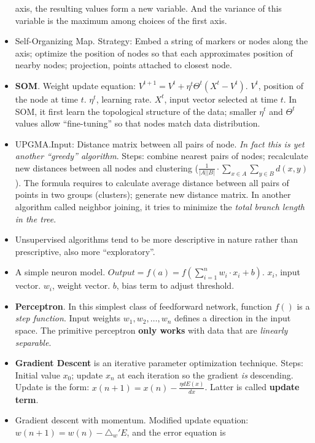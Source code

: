 \documentclass[twocolumn]{article}
\begin{document}
\begin{itemize}
  axis, the resulting values form a new variable. And the variance of
  this variable is the maximum among choices of the first axis.
\item Self-Organizing Map. Strategy: Embed a string of markers or
  nodes along the axis; optimize the position of nodes so that each
  approximates position of nearby nodes; projection, points attached
  to closest node.
\item \textbf{SOM}. Weight update equation:
  $V^{t+1}=V^{t}+\eta^{t}\Theta^{t}(X^{t}-V^{t})$. $V^{t}$, position
  of the node at time $t$. $\eta^{t}$, learning rate. $X^{t}$, input
  vector selected at time $t$. In SOM, it first learn the topological
  structure of the data; smaller $\eta^{t}$ and $\Theta^{t}$ values
  allow ``fine-tuning'' so that nodes match data distribution. 
\item UPGMA.\@ Input: Distance matrix between all pairs of
  node. \emph{In fact this is yet another ``greedy''
    algorithm}. Steps: combine nearest pairs of nodes; recalculate new
  distances between all nodes and clustering ($\frac{1}{|A||B|}\cdot
  \sum_{x\in A}\sum_{y\in B}d(x,y)$). The formula requires to
  calculate average distance between all pairs of points in two groups
  (clusters); generate new distance matrix. In another algorithm
  called neighbor joining, it tries to minimize the \emph{total branch
  length in the tree}.
\item Unsupervised algorithms tend to be more descriptive in nature
  rather than prescriptive, also more ``exploratory''. 
\item A simple neuron model. $Output=f(a)=f(\sum_{i=1}^{n}w_{i}\cdot
  x_{i}+b)$. $x_{i}$, input vector. $w_{i}$, weight vector. $b$, bias
  term to adjust threshold. 
\item \textbf{Perceptron}. In this simplest class of feedforward
  network, function $f()$ is a \emph{step function}. Input weights
  $w_{1},w_{2}, \ldots, w_{n}$ defines a direction in the input
  space. The primitive perceptron \textbf{only works} with data that
  are \emph{linearly separable}.
\item \textbf{Gradient Descent} is an iterative parameter optimization
  technique. Steps: Initial value $x_{0}$; update $x_{n}$ at each
  iteration so the gradient \emph{is} descending. Update is the form:
  $x(n+1)=x(n)-\frac{\eta dE(x)}{dx}$. Latter is called
  \textbf{update term}. 
\item Gradient descent with momentum. Modified update equation:
  $w(n+1)=w(n)-\triangle_{w}'E$, and the error equation is

\end{itemize}
\end{document}
